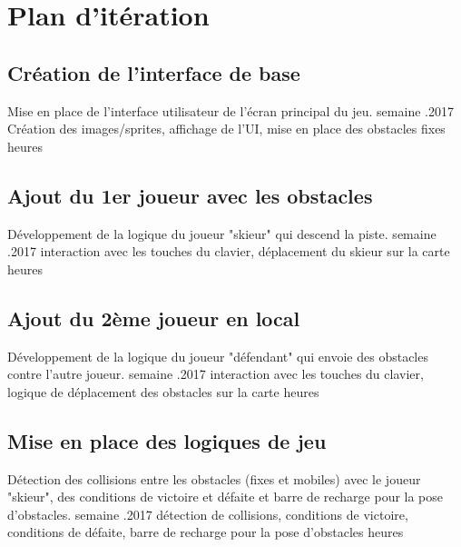 \documentclass[a4paper,11pt]{article}
\begin{document}
	\newpage
	\section{Plan d'itération}

		\subsection{Création de l'interface de base}
			\begin{enumerate}[labelwidth=5em,leftmargin=8em]
				\objectif Mise en place de l'interface utilisateur de l'écran principal du jeu.
				 semaine
				.2017
				\partageTache Création des images/sprites, affichage de l'UI, mise en place des obstacles fixes
				 heures
			\end{enumerate}
		\subsection{Ajout du 1er joueur avec les obstacles}
		\begin{enumerate}[labelwidth=5em,leftmargin=8em]
			\objectif Développement de la logique du joueur "skieur" qui descend la piste.
			 semaine
			.2017
			\partageTache interaction avec les touches du clavier, déplacement du skieur sur la carte
			 heures
		\end{enumerate}
		\subsection{Ajout du 2ème joueur en local}
		\begin{enumerate}[labelwidth=5em,leftmargin=8em]
			\objectif Développement de la logique du joueur "défendant" qui envoie des obstacles contre l'autre joueur.
			 semaine
			.2017
			\partageTache interaction avec les touches du clavier, logique de déplacement des obstacles sur la carte
			 heures
		\end{enumerate}
		\subsection{Mise en place des logiques de jeu}
		\begin{enumerate}[labelwidth=5em,leftmargin=8em]
			\objectif Détection des collisions entre les obstacles (fixes et mobiles) avec le joueur "skieur", des conditions de victoire et défaite et barre de recharge pour la pose d'obstacles.
			 semaine
			.2017
			\partageTache détection de collisions, conditions de victoire, conditions de défaite, barre de recharge pour la pose d'obstacles
			 heures
		\end{enumerate}
\end{document}
